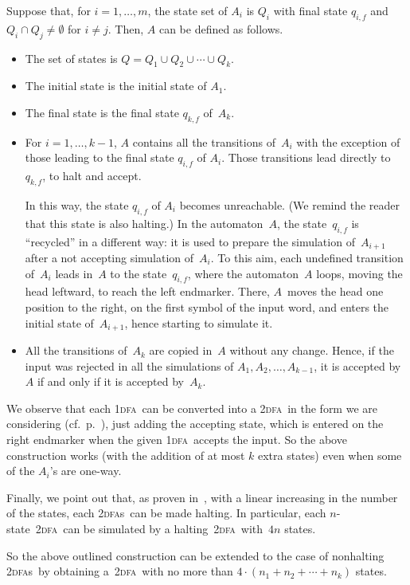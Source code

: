 \documentclass[11pt]{article}
\newcommand*{\tw}{\textsc{2}}
\newcommand*{\twdfa}{\tw\textsc{dfa}}
\newcommand*{\twdfas}{\tw\textsc{dfa}s}
\newcommand*{\ow}{\textsc{1}}
\newcommand*{\owdfa}{\ow\textsc{dfa}}
\begin{document}
Suppose that, for $i=1,\ldots,m$, the state set of $A_i$ is $Q_i$ with final state $q_{i,f}$
and $Q_i\cap Q_j\neq\emptyset$ for $i\neq j$.
Then, $A$ can be defined as follows.
\begin{itemize}
\item The set of states is $Q=Q_1\cup Q_2\cup\cdots\cup Q_k$.
\item The initial state is the initial state of $A_1$.
\item The final state is the final state $q_{k,f}$ of~$A_k$.
\item For $i=1,\ldots,k-1$, $A$ contains all the transitions of~$A_i$ with the exception
of those leading to the final state $q_{i,f}$ of $A_i$. Those transitions lead directly to~$q_{k,f}$, to halt and accept.

In this way, the state $q_{i,f}$ of $A_i$ becomes unreachable. (We remind the reader that this state is also
halting.) In the automaton~$A$, the state~$q_{i,f}$ is ``recycled'' in a different way: it is used to prepare the 
simulation of~$A_{i+1}$ after a not accepting
simulation of~$A_i$. To this aim, each undefined transition of~$A_i$ leads in~$A$ to the state~$q_{i,f}$,
where the automaton~$A$ loops, moving the head leftward, to reach the left endmarker. There, $A$~moves the head one
position to the right, on the first symbol of the input word, and 
enters the initial state of~$A_{i+1}$, hence starting to simulate it.
\item All the transitions of~$A_k$ are copied in~$A$ without any change. Hence, if the input was rejected in all the
simulations of $A_1,A_2,\ldots,A_{k-1}$, it is accepted by~$A$ if and only if it is accepted by~$A_k$.
\end{itemize}

We observe that each \owdfa\ can be converted into a \twdfa\ in the form we are considering (cf.\ p.~\pageref{p:twdfa}), 
just adding the accepting state, which is entered on the right endmarker when the given \owdfa\ accepts the input. 
So the above construction works (with the addition of at most $k$ extra states) 
even when some of the $A_i$'s are one-way.

Finally, we point out that, as proven in~\cite{GeffertMereghettiPighizzini2007},
with a linear increasing in the number of the states, each \twdfas\ can be made halting.
In particular, each $n$-state~\twdfa\ can be simulated by a halting~\twdfa\ with~$4n$ states.

So the above outlined construction can be extended to the case of nonhalting \twdfas\ by
obtaining a~\twdfa\ with no more than $4\cdot(n_1+n_2+\cdots+n_k)$ states.
\end{document}
